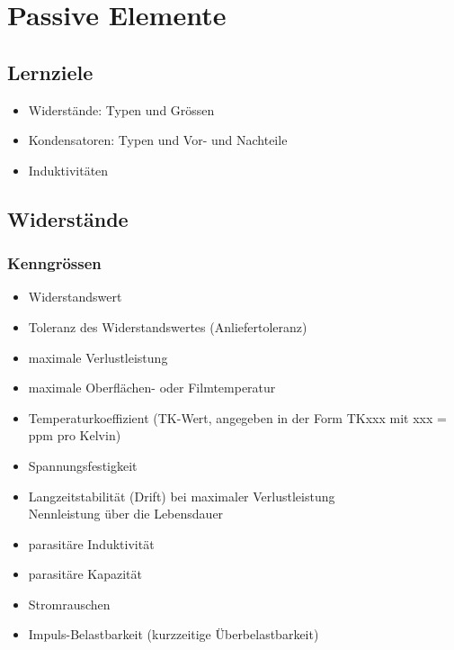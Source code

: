 \section{Passive Elemente}
\subsection{Lernziele}
\begin{itemize}
  \item Widerstände: Typen und Grössen
  \item Kondensatoren: Typen und Vor- und Nachteile
  \item Induktivitäten
\end{itemize}

\subsection{Widerstände}
\subsubsection{Kenngrössen}
\begin{itemize}
  \item Widerstandswert
  \item Toleranz des Widerstandswertes (Anliefertoleranz)
  \item maximale Verlustleistung
  \item maximale Oberflächen- oder Filmtemperatur
  \item Temperaturkoeffizient (TK-Wert, angegeben in der Form TKxxx mit xxx = ppm pro Kelvin)
  \item Spannungsfestigkeit
  \item Langzeitstabilität (Drift) bei maximaler Verlustleistung\\
  Nennleistung über die Lebensdauer
  \item parasitäre Induktivität
  \item parasitäre Kapazität
  \item Stromrauschen
  \item Impuls-Belastbarkeit (kurzzeitige Überbelastbarkeit)
\end{itemize}

